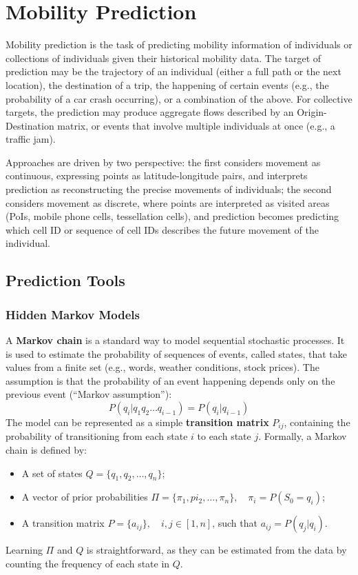 \chapter{Mobility Prediction}

Mobility prediction is the task of predicting mobility information of individuals or collections of individuals given their historical mobility data. The target of prediction may be the trajectory of an individual (either a full path or the next location), the destination of a trip, the happening of certain events (e.g., the probability of a car crash occurring), or a combination of the above. For collective targets, the prediction may produce aggregate flows described by an Origin-Destination matrix, or events that involve multiple individuals at once (e.g., a traffic jam).

Approaches are driven by two perspective: the first considers movement as continuous, expressing points as latitude-longitude pairs, and interprets prediction as reconstructing the precise movements of individuals; the second considers movement as discrete, where points are interpreted as visited areas (PoIs, mobile phone cells, tessellation cells), and prediction becomes predicting which cell ID or sequence of cell IDs describes the future movement of the individual.

\section{Prediction Tools}

\subsection{Hidden Markov Models}

A \textbf{Markov chain} is a standard way to model sequential stochastic processes. It is used to estimate the probability of sequences of events, called states, that take values from a finite set (e.g., words, weather conditions, stock prices). The assumption  is that the probability of an event happening depends only on the previous event (``Markov assumption''):
\begin{equation*}
    P(q_i | q_1 q_2 \dots q_{i-1}) = P(q_i | q_{i-1})
\end{equation*}
The model can be represented as a simple \textbf{transition matrix} $P_{ij}$, containing the probability of transitioning from each state $i$ to each state $j$. Formally, a Markov chain is defined by:
\begin{itemize}[noitemsep]
    \item A set of states $Q = \{q_1, q_2, \dots, q_n\}$;
    \item A vector of prior probabilities $\Pi = \{\pi_1, pi_2, \dots, \pi_n\}, \quad \pi_i = P(S_0 = q_i)$;
    \item A transition matrix $P = \{ a_{ij} \}, \quad i,j \in [1,n]$, such that $a_{ij} = P(q_j|q_i)$.
\end{itemize}
Learning $\Pi$ and $Q$ is straightforward, as they can be estimated from the data by counting the frequency of each state in $Q$.

